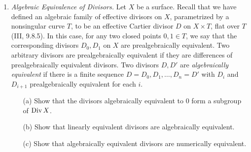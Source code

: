 \documentclass[a4paper]{article}
\begin{document}
\begin{enumerate} [label=\textbf{\arabic*.}, leftmargin=0em]
          \begin{proof} $ $ \vspace{0pt}
              \begin{itemize} [leftmargin=0cm]
                  \item[(a)] By definition, $\omega_{C} \cong \fO_X(-\Delta) \otimes \fO_\Delta$, and by (1.3), $\deg_\Delta(\fO_X(-\Delta) \otimes \fO_\Delta) = -\Delta^2$.
                        Hence, we have
                        \begin{equation*}
                            \Delta^2 = - \deg_\Delta(\fO_X(-\Delta) \otimes \fO_\Delta) = -\deg(\omega_C) = 2 - 2g.
                        \end{equation*}

                  \item[(b)] Suppose $D = a l + b m + c \Delta = 0$ in $\Num(C \times C)$ for some integers $a, b, c \in \Z$.
                        It is not hard to see
                        \begin{equation*}
                            l^2 = m^2 = 0, \quad l.m = 1, \quad \Delta.l = \Delta.m = 1,
                        \end{equation*}
                        which implies
                        \begin{equation*}
                            D.m = b + c = 0, \quad D.l = a + c = 0, \quad D.\Delta = a + b + c(2 - 2g) = 0.
                        \end{equation*}
                        Combining the first two gives $a + b + 2c = 0$.
                        The condition $g \geq 1$ forces $a, b, c = 0$, which is what we wanted to show.
              \end{itemize}
          \end{proof}

    \item \textit{Algebraic Equivalence of Divisors.} Let $X$ be a surface.
          Recall that we have defined an algebraic family of effective divisors on $X$, parametrized by a nonsingular curve $T$, to be an effective Cartier divisor $D$ on $X \times T$, flat over $T$ (III, 9.8.5).
          In this case, for any two closed points $0, 1 \in T$, we say that the corresponding divisors $D_0, D_1$ on $X$ are prealgebraically equivalent.
          Two arbitrary divisors are prealgebraically equivalent if they are differences of prealgebraically equivalent divisors.
          Two divisors $D, D'$ are \textit{algebraically equivalent} if there is a finite sequence $D = D_0, D_1, \dots, D_n = D'$ with $D_i$ and $D_{i + 1}$ prealgebraically equivalent for each $i$.
          \begin{itemize}
              \item[(a)] Show that the divisors algebraically equivalent to 0 form a subgroup of $\operatorname{Div}{X}$.
              \item[(b)] Show that linearly equivalent divisors are algebraically equivalent.
              \item[(c)] Show that algebraically equivalent divisors are numerically equivalent.
          \end{itemize}


\end{enumerate}
\end{document}
